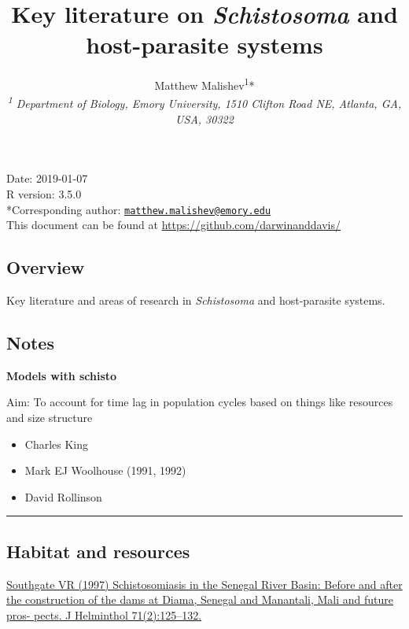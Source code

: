 \documentclass[10,portrait]{article}
\title{Key literature on \emph{Schistosoma} and host-parasite systems}
\author{Matthew
Malishev\textsuperscript{1}*\\[2\baselineskip]\emph{\textsuperscript{1}
Department of Biology, Emory University, 1510 Clifton Road NE, Atlanta,
GA, USA, 30322}}
\date{}
\providecommand{\tightlist}{%
  \setlength{\itemsep}{0pt}\setlength{\parskip}{0pt}}
\begin{document}
\maketitle

{
\hypersetup{linkcolor=black}
\setcounter{tocdepth}{3}
\tableofcontents
}
\newpage   

Date: 2019-01-07\\
R version: 3.5.0\\
*Corresponding author:
\href{mailto:matthew.malishev@emory.edu}{\nolinkurl{matthew.malishev@emory.edu}}\\
This document can be found at \url{https://github.com/darwinanddavis/}

\newpage  

\subsection{Overview}\label{overview}

Key literature and areas of research in \emph{Schistosoma} and
host-parasite systems.

\subsection{Notes}\label{notes}

\textbf{Models with schisto}

Aim: To account for time lag in population cycles based on things like
resources and size structure

\begin{itemize}
\tightlist
\item
  Charles King\\
\item
  Mark EJ Woolhouse (1991, 1992)\\
\item
  David Rollinson
\end{itemize}

\newpage  

\begin{center}\rule{0.5\linewidth}{\linethickness}\end{center}

\subsection{Habitat and resources}\label{habitat-and-resources}

\href{Southgate\%20VR\%20(1997)\%20Schistosomiasis\%20in\%20the\%20Senegal\%20River\%20Basin:\%20Before\%20and\%20after\%20the\%20construction\%20of\%20the\%20dams\%20at\%20Diama,\%20Senegal\%20and\%20Manantali,\%20Mali\%20and\%20future\%20pros-\%20pects.\%20J\%20Helminthol\%2071(2):125–132}{Southgate
VR (1997) Schistosomiasis in the Senegal River Basin: Before and after
the construction of the dams at Diama, Senegal and Manantali, Mali and
future pros- pects. J Helminthol 71(2):125--132.}
\end{document}
